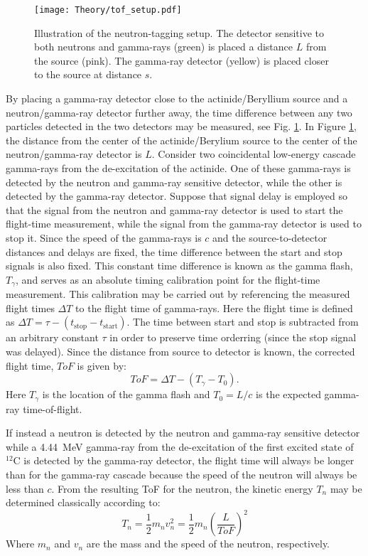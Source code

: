 \documentclass[main.tex]{subfiles}
\begin{document}
\begin{figure}[t]
    \centering
        \texttt{[image: Theory/tof\_setup.pdf]}
        \caption[Illustration of the neutron-tagging setup]{Illustration of the neutron-tagging setup. The detector sensitive to both neutrons and gamma-rays (green) is placed a distance $L$ from the source (pink). The gamma-ray detector (yellow) is placed closer to the source at distance $s$. }
    \label{fig:tof_setup} 
\end{figure}

By placing a gamma-ray detector close to the actinide/Beryllium source and a neutron/gamma-ray detector further away, the time difference between any two particles detected in the two detectors may be measured, see Fig. \ref{fig:tof_setup}. 
In Figure \ref{fig:tof_setup}, the distance from the center of the actinide/Berylium source to the center of the neutron/gamma-ray detector is $L$. Consider two coincidental low-energy cascade gamma-rays from the de-excitation of the actinide. One of these gamma-rays is detected by the neutron and gamma-ray sensitive detector, while the other is detected by the gamma-ray detector. Suppose that signal delay is employed so that the signal from the neutron and gamma-ray detector is used to start the flight-time measurement, while the signal from the gamma-ray detector is used to stop it. Since the speed of the gamma-rays is $c$ and the source-to-detector distances and delays are fixed, the time difference between the start and stop signals is also fixed. This constant time difference is known as the gamma flash, $T_\gamma$, and serves as an absolute timing calibration point for the flight-time measurement. This calibration may be carried out by referencing the measured flight times $\Delta T$ to the flight time of gamma-rays. Here the flight time is defined as $\Delta T=\tau -(t_{\textrm{stop}}-t_{\textrm{start}})$. The time between start and stop is subtracted from an arbitrary constant $\tau$ in order to preserve time orderring (since the stop signal was delayed). Since the distance from source to detector is known, the corrected flight time, $ToF$ is given by:
\begin{equation}
	ToF = \Delta T -(T_\gamma - T_0).
	\label{eq:tof_cal}
\end{equation}
Here $T_\gamma$ is the location of the gamma flash and $T_0=L/c$ is the expected gamma-ray time-of-flight.

If instead a neutron is detected by the neutron and gamma-ray sensitive detector while a \SI{4.44}{\MeV} gamma-ray from the de-excitation of the first excited state of $^\textrm{12}$C is detected by the gamma-ray detector, the flight time will always be longer than for the gamma-ray cascade because the speed of the neutron will always be less than $c$. From the resulting ToF for the neutron, the kinetic energy $T_n$ may be determined classically according to:
\begin{equation}
	T_n = \frac{1}{2} m_n v_n^2 = \frac{1}{2}m_n\left(\frac{L}{ToF}\right)^2
	\label{eq:Tn}
\end{equation}
Where $m_n$ and $v_n$ are the mass and the speed of the neutron, respectively.
\end{document}
